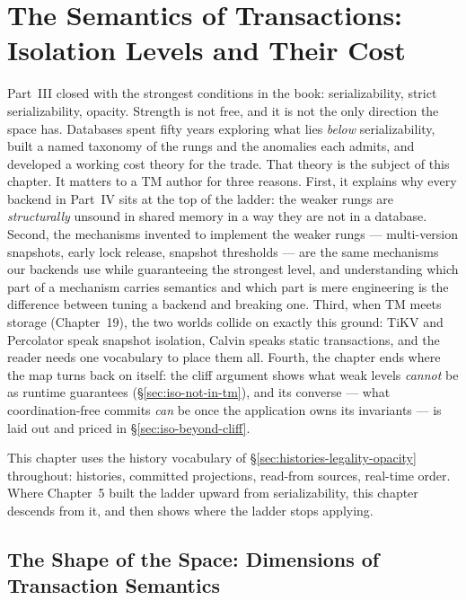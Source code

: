 \chapter[The Semantics of Transactions]{The Semantics of Transactions:
Isolation Levels and Their Cost}
\label{chap:isolation}

Part~III closed with the strongest conditions in the book: serializability,
strict serializability, opacity. Strength is not free, and it is not the only
direction the space has. Databases spent fifty years exploring what lies
\emph{below} serializability, built a named taxonomy of the rungs and the
anomalies each admits, and developed a working cost theory for the trade. That
theory is the subject of this chapter. It matters to a TM author for three
reasons. First, it explains why every backend in Part~IV sits at the top of
the ladder: the weaker rungs are \emph{structurally} unsound in shared memory
in a way they are not in a database. Second, the mechanisms invented to
implement the weaker rungs --- multi-version snapshots, early lock release,
snapshot thresholds --- are the same mechanisms our backends use while
guaranteeing the strongest level, and understanding which part of a mechanism
carries semantics and which part is mere engineering is the difference between
tuning a backend and breaking one. Third, when TM meets storage
(Chapter~19), the two worlds collide on exactly this ground: TiKV and
Percolator speak snapshot isolation, Calvin speaks static transactions, and
the reader needs one vocabulary to place them all. Fourth, the chapter ends
where the map turns back on itself: the cliff argument shows what weak
levels \emph{cannot} be as runtime guarantees
(\S\ref{sec:iso-not-in-tm}), and its converse --- what coordination-free
commits \emph{can} be once the application owns its invariants --- is laid
out and priced in \S\ref{sec:iso-beyond-cliff}.

This chapter uses the history vocabulary of \S\ref{sec:histories-legality-opacity}
throughout: histories, committed projections, read-from sources, real-time
order. Where Chapter~5 built the ladder upward from serializability, this
chapter descends from it, and then shows where the ladder stops applying.

\section{The Shape of the Space: Dimensions of Transaction Semantics}
\label{sec:iso-dimensions}

